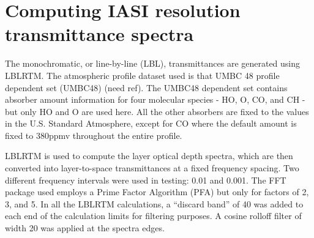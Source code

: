 \section{Computing IASI resolution transmittance spectra}
\label{sec:computing_iasi_tau}
The monochromatic, or line-by-line (LBL), transmittances are generated using LBLRTM\cite{ref:lblrtm}. The atmospheric profile dataset used is that UMBC 48 profile dependent set (UMBC48) (need ref). The UMBC48 dependent set contains absorber amount information for four molecular species - HO, O, CO, and CH - but only HO and O are used here. All the other absorbers are fixed to the values in the U.S. Standard Atmosphere, except for CO where the default amount is fixed to 380ppmv throughout the entire profile.

LBLRTM is used to compute the layer optical depth spectra, which are then converted into layer-to-space transmittances at a fixed frequency spacing. Two different frequency intervals were used in testing: 0.01{\invcm} and 0.001{\invcm}. The FFT package used\cite{ref:fft_package} employs a Prime Factor Algorithm (PFA) but only for factors of 2, 3, and 5. In all the LBLRTM calculations, a ``discard band'' of 40\invcm{} was added to each end of the calculation limits for filtering purposes. A cosine rolloff filter of width 20{\invcm} was applied at the spectra edges.

